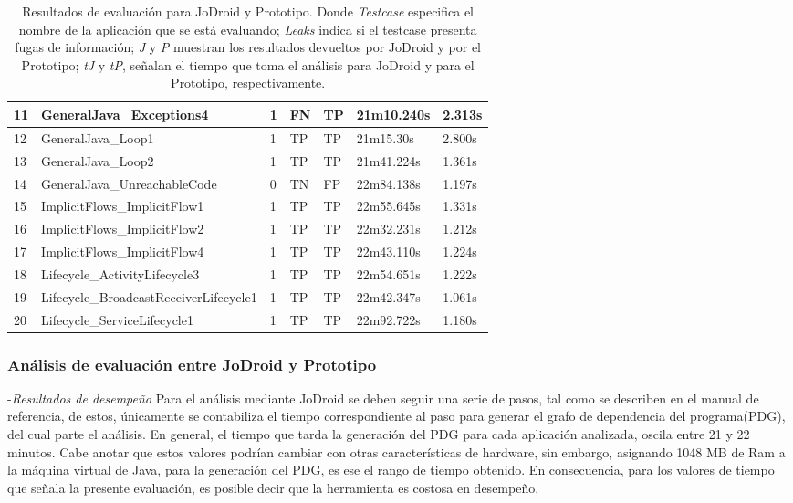 \begin{table}[H]
\begin{center}
\begin{tabular}{|p{0.8cm}|p{6cm}|p{1cm}|p{0.8cm}|p{0.8cm}|p{}|p{1cm}|}
	\hline
	11 & GeneralJava\_Exceptions4 & 1 & FN  & TP & 21m10.240s &2.313s\\
	\hline
	12 & GeneralJava\_Loop1 & 1 & TP & TP &21m15.30s&2.800s\\
	\hline
	13 & GeneralJava\_Loop2 & 1 & TP & TP &21m41.224s&1.361s\\
	\hline
	14 & GeneralJava\_UnreachableCode & 0 & TN & FP &22m84.138s&1.197s\\
	\hline
	15 & ImplicitFlows\_ImplicitFlow1 & 1 & TP & TP &22m55.645s&1.331s\\
	\hline
	16 & ImplicitFlows\_ImplicitFlow2 & 1 & TP & TP &22m32.231s&1.212s\\
	\hline
	17 & ImplicitFlows\_ImplicitFlow4 & 1 & TP & TP &22m43.110s&1.224s\\
	\hline
	18 & Lifecycle\_ActivityLifecycle3 & 1 & TP & TP &22m54.651s&1.222s\\
	\hline
	19 & Lifecycle\_BroadcastReceiverLifecycle1 & 1 & TP & TP &22m42.347s&1.061s\\
	\hline
	20 & Lifecycle\_ServiceLifecycle1 & 1 & TP & TP &22m92.722s&1.180s\\
	\hline
\end{tabular}
\end{center}
\caption{Resultados de evaluación para JoDroid y Prototipo. Donde
\textit{Testcase} especifica el nombre de la aplicación que se está evaluando;
\textit{Leaks} indica si el testcase presenta fugas de información; \textit{J} y
\textit{P} muestran los resultados devueltos por JoDroid y por el Prototipo;
\textit{tJ} y \textit{tP}, señalan el tiempo que toma el análisis para JoDroid
y para el Prototipo, respectivamente.}
\label{tab:JoDroid-Prototipo}
\end{table}

\subsubsection{Análisis de evaluación entre JoDroid y Prototipo}
-\textit{Resultados de desempeño}\newline
Para el análisis mediante JoDroid se deben seguir una serie de pasos, tal como
se describen en el manual de referencia\cite{joDroidManual}, de estos,
únicamente se contabiliza el tiempo correspondiente al paso para generar el
grafo de dependencia del programa(PDG), del cual parte el análisis. En general,
el tiempo que tarda la generación del PDG para cada aplicación analizada, oscila
entre 21 y 22 minutos. Cabe anotar que estos valores podrían cambiar con otras
características de hardware, sin embargo, asignando 1048 MB de Ram a la máquina
virtual de Java, para la generación del PDG, es ese el rango de tiempo obtenido.
En consecuencia, para los valores de tiempo que señala la presente evaluación,
es posible decir que la herramienta es costosa en desempeño.

